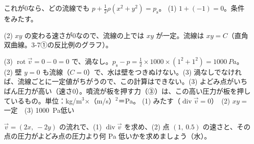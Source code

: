 \begin{phreidai}
これが0なら、どの流線でも $p+\tfrac{1}{2}\rho(x^2+y^2)=p_{\mathrm s}$。
\phtoku
(1) $1+(-1)=0$。条件をみたす。\par
(2) $xy$ の変わる速さが0なので、流線の上では $xy$ が一定。流線は $xy=C$（直角双曲線。3-7①の反比例のグラフ）。\par
(3) $\operatorname{rot}\vec v=0-0=0$ で、渦なし。$p_{\mathrm s}-p=\tfrac{1}{2}\times1000\times(1^2+1^2)=\qty{1000}{Pa}$。
\phtashikame
(2) 壁 $y=0$ も流線（$C=0$）で、水は壁をつきぬけない。(3) 渦なしでなければ、流線ごとに一定値がちがうので、この計算はできない。(3) よどみ点がいちばん圧力が高い（速さ0）。噴流が板を押す力（③）は、この高い圧力が板を押しているもの。単位：kg/m$^3$×（m/s）$^2$＝Pa。
\kotae (1) みたす（$\operatorname{div}\vec{v}=0$）　(2) $xy=$一定　(3) \qty{1000}{Pa}低い
\end{phreidai}
\begin{jibun}
$\vec{v}=(2x,\ -2y)$ の流れで、(1) $\operatorname{div}\vec{v}$ を求め、(2) 点 $(1,\ 0.5)$ の速さと、その点の圧力がよどみ点の圧力より何 Pa 低いかを求めましょう（水）。
\end{jibun}

